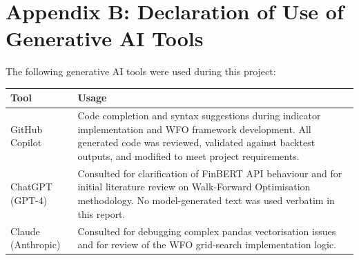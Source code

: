 \documentclass[11pt,twoside,a4paper]{article}
\begin{document}
\section*{Appendix B: Declaration of Use of Generative AI Tools}

The following generative AI tools were used during this project:

{\small
\begin{tabular}{>{\raggedright\arraybackslash}p{3.8cm}%
                >{\raggedright\arraybackslash}p{10.5cm}}
\hline
Tool & Usage \\
\hline
GitHub Copilot & Code completion and syntax suggestions during indicator implementation and WFO framework development. All generated code was reviewed, validated against backtest outputs, and modified to meet project requirements. \\[4pt]
ChatGPT (GPT-4) & Consulted for clarification of FinBERT API behaviour and for initial literature review on Walk-Forward Optimisation methodology. No model-generated text was used verbatim in this report. \\[4pt]
Claude (Anthropic) & Consulted for debugging complex pandas vectorisation issues and for review of the WFO grid-search implementation logic. \\
\hline
\end{tabular}
}
\end{document}
